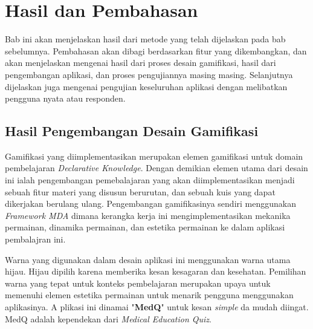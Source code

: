 \chapter{Hasil dan Pembahasan}
Bab ini akan menjelaskan hasil dari metode yang telah dijelaskan pada bab sebelumnya. 
Pembahasan akan dibagi berdasarkan fitur yang dikembangkan, dan akan menjelaskan mengenai hasil dari proses desain gamifikasi, hasil dari pengembangan aplikasi, dan proses pengujiannya masing masing.
Selanjutnya dijelaskan juga mengenai pengujian keseluruhan aplikasi dengan melibatkan pengguna nyata atau responden.

\section{Hasil Pengembangan Desain Gamifikasi}
Gamifikasi yang diimplementasikan merupakan elemen gamifikasi untuk domain pembelajaran \textit{Declarative Knowledge}.
Dengan demikian elemen utama dari desain ini ialah pengembangan pemebalajaran yang akan diimplementasikan menjadi sebuah fitur materi yang disusun berurutan, dan sebuah kuis yang dapat dikerjakan berulang ulang.
Pengembangan gamifikasinya sendiri menggunakan \textit{Framework MDA} dimana kerangka kerja ini mengimplementasikan mekanika permainan, dinamika permainan, dan estetika permainan ke dalam aplikasi pembalajran ini.

Warna yang digunakan dalam desain aplikasi ini menggunakan warna utama hijau.
Hijau dipilih karena memberika kesan kesagaran dan kesehatan.
Pemilihan warna yang tepat untuk konteks pembelajaran merupakan upaya untuk memenuhi elemen estetika permainan untuk menarik pengguna menggunakan aplikasinya.  A
plikasi ini dinamai "\textbf{MedQ}" untuk kesan \textit{simple} da mudah diingat. MedQ adalah kependekan dari \textit{Medical Education Quiz}.
